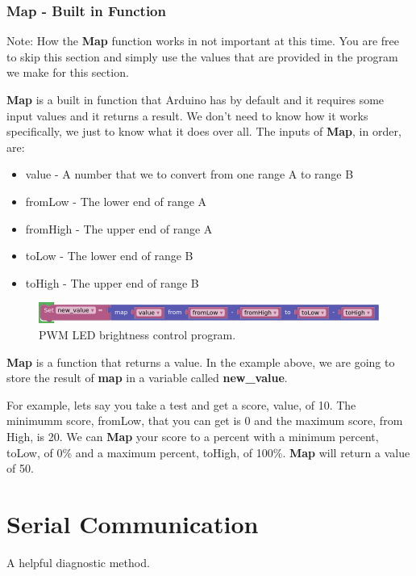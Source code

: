 \documentclass[12pt]{article}
\begin{document}
	\subsubsection{Map - Built in Function}
	
	Note: How the \textbf{Map} function works in not important at this time. You are free to skip this section and simply use the values that are provided in the program we make for this section.
	
	\textbf{Map} is a built in function that Arduino has by default and it requires some input values and it returns a result. We don't need to know how it works specifically, we just to know what it does over all. The inputs of \textbf{Map}, in order, are:
	
	
	
	\begin{itemize}
		\itemsep -1em
		\item value - A number that we to convert from one range A to range B
		\item fromLow - The lower end of range A
		\item fromHigh - The upper end of range A
		\item toLow - The lower end of range B
		\item toHigh - The upper end of range B
	\end{itemize}

	\begin{figure}[H]
	\begin{center}
		\includegraphics[scale=0.5]{MAP_parameters}
		\caption{PWM LED brightness control program.}
		\label{fn:MAP_parameters}
	\end{center}
	\end{figure}

	\textbf{Map} is a function that returns a value. In the example above, we are going to store the result of \textbf{map} in a variable called \textbf{new\_value}.
	
	For example, lets say you take a test and get a score, value, of 10. The minimumm score, fromLow, that you can get is 0 and the maximum score, from High, is 20. We can \textbf{Map} your score to a percent with a minimum percent, toLow, of 0\% and a maximum percent, toHigh, of 100\%. \textbf{Map} will return a value of 50.
	
	
	
	\section{Serial Communication}
	
	A helpful diagnostic method.
	
	
	
	
	
	
\end{document}
